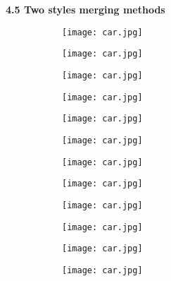 \begin{flushleft}
	\textbf{4.5 Two styles merging methods}\newline
\end{flushleft}
\begin{figure}[h!]
	\centering
	\begin{subfigure}[b]{0.16\linewidth}
		\texttt{[image: car.jpg]} %
	\end{subfigure}
	\begin{subfigure}[b]{0.16\linewidth}
		\texttt{[image: car.jpg]} %
	\end{subfigure}
	\begin{subfigure}[b]{0.16\linewidth}
		\texttt{[image: car.jpg]} %
	\end{subfigure}
	\begin{subfigure}[b]{0.16\linewidth}
		\texttt{[image: car.jpg]} %
	\end{subfigure}
	\begin{subfigure}[b]{0.16\linewidth}
		\texttt{[image: car.jpg]} %
	\end{subfigure}
	\begin{subfigure}[b]{0.16\linewidth}
		\texttt{[image: car.jpg]} %
	\end{subfigure}
	\centering
	\begin{subfigure}[b]{0.16\linewidth}
		\texttt{[image: car.jpg]} %
	\end{subfigure}
	\begin{subfigure}[b]{0.16\linewidth}
		\texttt{[image: car.jpg]} %
	\end{subfigure}
	\begin{subfigure}[b]{0.16\linewidth}
		\texttt{[image: car.jpg]} %
	\end{subfigure}
	\begin{subfigure}[b]{0.16\linewidth}
		\texttt{[image: car.jpg]} %
	\end{subfigure}
	\begin{subfigure}[b]{0.16\linewidth}
		\texttt{[image: car.jpg]} %
	\end{subfigure}
	\begin{subfigure}[b]{0.16\linewidth}
		\texttt{[image: car.jpg]} %

\end{subfigure}
\end{figure}
